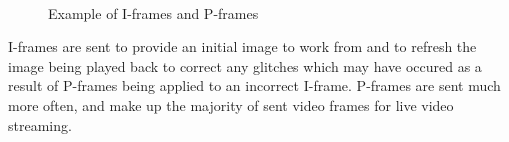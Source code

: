 \documentclass{mpaper}
\begin{document}
\begin{figure}[h!]
 \centering
 \\
 \centering
 \caption{Example of I-frames and P-frames}
 \label{frame-example}
\end{figure}

I-frames are sent to provide an initial image to work from and to refresh the image being played back to correct any glitches which may have occured as a result of P-frames being applied to an incorrect I-frame. P-frames are sent much more often, and make up the majority of sent video frames for live video streaming.
\end{document}
